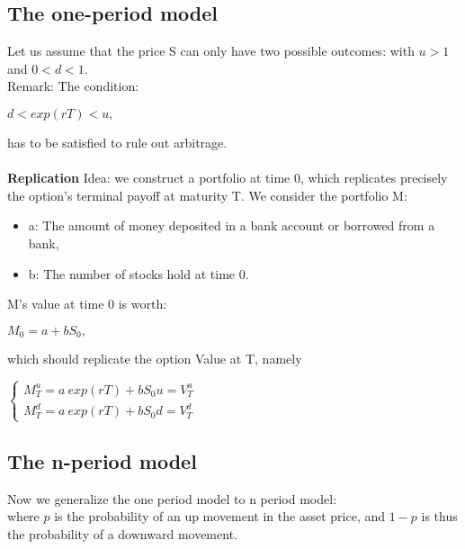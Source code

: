 \documentclass{article}
\begin{document}
\subsection{The one-period model}
Let us assume that the price S can only have two possible outcomes:
with $u>1$ and $0<d<1$.\\
Remark: The condition:
\begin{center}
	$d<exp\left( rT\right)  <u,$
\end{center}
has to be satisfied to rule out arbitrage.\\~\\
\textbf{Replication} 
Idea: we construct a portfolio at time 0, which replicates precisely the option's terminal payoff at maturity T. We consider the portfolio M:
\begin{itemize}
	\item a: The amount of money deposited in a bank account or borrowed from a bank,
	\item b: The number of stocks hold at time 0.
\end{itemize}

M's value at time 0 is worth:
\begin{center}
	$M_{0}=a+bS_{0},$
\end{center}

which should replicate the option Value at T, namely
\begin{center}
	$\begin{cases}M^{u}_{T}=a\  exp\left( rT\right)  +bS_{0}u=V^{u}_{T}&\\ M^{d}_{T}=a\  exp\left( rT\right)  +bS_{0}d=V^{d}_{T}&\end{cases} $
\end{center}

\subsection{The n-period model}
Now we generalize the one period model to n period model:
\\
where $p$ is the probability of an up movement in the asset price, and $1-p$ is thus the probability of a downward movement.
\end{document}
